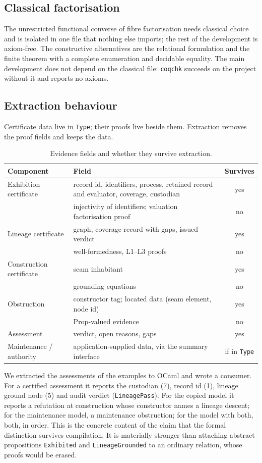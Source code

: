 \subsection{Classical factorisation}
The unrestricted functional converse of fibre factorisation needs classical choice and is isolated in one file that nothing else imports; the rest of the development is axiom-free. The constructive alternatives are the relational formulation and the finite theorem with a complete enumeration and decidable equality. The main development does not depend on the classical file: \texttt{coqchk} succeeds on the project without it and reports no axioms.

\subsection{Extraction behaviour}
Certificate data live in \texttt{Type}; their proofs live beside them. Extraction removes the proof fields and keeps the data.

\begin{table}[t]
\centering\small
\caption{Evidence fields and whether they survive extraction.}\label{tab:survive}
\begin{tabularx}{\textwidth}{@{}lYc@{}}
\toprule
Component & Field & Survives \\
\midrule
Exhibition certificate & record id, identifiers, process, retained record and evaluator, coverage, custodian & yes \\
 & injectivity of identifiers; valuation factorisation proof & no \\
Lineage certificate & graph, coverage record with gaps, issued verdict & yes \\
 & well-formedness, L1--L3 proofs & no \\
Construction certificate & seam inhabitant & yes \\
 & grounding equations & no \\
Obstruction & constructor tag; located data (seam element, node id) & yes \\
 & Prop-valued evidence & no \\
Assessment & verdict, open reasons, gaps & yes \\
Maintenance / authority & application-supplied data, via the summary interface & if in \texttt{Type} \\
\bottomrule
\end{tabularx}
\end{table}

We extracted the assessments of the examples to OCaml and wrote a consumer. For a certified assessment it reports the custodian (7), record id (1), lineage ground node (5) and audit verdict (\texttt{LineagePass}). For the copied model it reports a refutation at construction whose constructor names a lineage descent; for the maintenance model, a maintenance obstruction; for the model with both, both, in order. This is the concrete content of the claim that the formal distinction survives compilation. It is materially stronger than attaching abstract propositions \texttt{Exhibited} and \texttt{LineageGrounded} to an ordinary relation, whose proofs would be erased.


